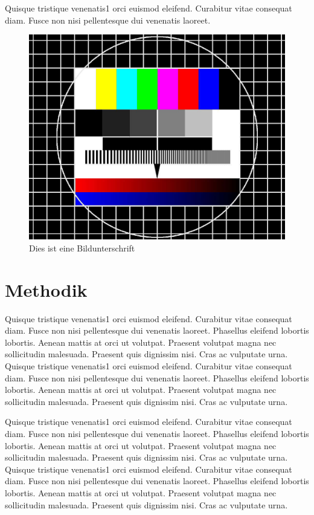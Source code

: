 \documentclass[
						a4paper,					%
						9.5pt,						%
	                    twocolumn				%
]{article}											%
\begin{document}
Quisque tristique venenatis1 orci euismod eleifend. Curabitur vitae consequat diam. Fusce non nisi pellentesque dui venenatis laoreet.

\begin{figure}[hbt]
  \includegraphics[width=\linewidth]{bilder/testbild.jpg}
  \caption{Dies ist eine Bildunterschrift}
  \label{fig:testbild}
\end{figure}





\section{Methodik}

Quisque tristique venenatis1 orci euismod eleifend. Curabitur vitae consequat diam. Fusce non nisi pellentesque dui venenatis laoreet. Phasellus eleifend lobortis lobortis. Aenean mattis at orci ut volutpat. Praesent volutpat magna nec sollicitudin malesuada. Praesent quis dignissim nisi. Cras ac vulputate urna.
Quisque tristique venenatis1 orci euismod eleifend. Curabitur vitae consequat diam. Fusce non nisi pellentesque dui venenatis laoreet. Phasellus eleifend lobortis lobortis. Aenean mattis at orci ut volutpat. Praesent volutpat magna nec sollicitudin malesuada. Praesent quis dignissim nisi. Cras ac vulputate urna.

Quisque tristique venenatis1 orci euismod eleifend. Curabitur vitae consequat diam. Fusce non nisi pellentesque dui venenatis laoreet. Phasellus eleifend lobortis lobortis. Aenean mattis at orci ut volutpat. Praesent volutpat magna nec sollicitudin malesuada. Praesent quis dignissim nisi. Cras ac vulputate urna.
Quisque tristique venenatis1 orci euismod eleifend. Curabitur vitae consequat diam. Fusce non nisi pellentesque dui venenatis laoreet. Phasellus eleifend lobortis lobortis. Aenean mattis at orci ut volutpat. Praesent volutpat magna nec sollicitudin malesuada. Praesent quis dignissim nisi. Cras ac vulputate urna.
\end{document}
